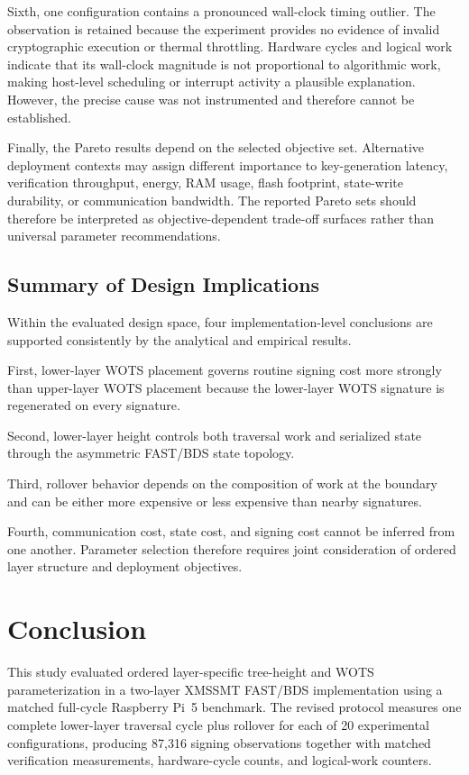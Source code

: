 \documentclass[pdflatex,sn-mathphys-num]{sn-jnl}
\begin{document}
Sixth, one configuration contains a pronounced wall-clock timing
outlier. The observation is retained because the experiment provides no
evidence of invalid cryptographic execution or thermal throttling.
Hardware cycles and logical work indicate that its wall-clock magnitude
is not proportional to algorithmic work, making host-level scheduling
or interrupt activity a plausible explanation. However, the precise
cause was not instrumented and therefore cannot be established.

Finally, the Pareto results depend on the selected objective set.
Alternative deployment contexts may assign different importance to
key-generation latency, verification throughput, energy, RAM usage,
flash footprint, state-write durability, or communication bandwidth.
The reported Pareto sets should therefore be interpreted as
objective-dependent trade-off surfaces rather than universal parameter
recommendations.

\subsection{Summary of Design Implications}
\label{sec:discussion_summary}

Within the evaluated design space, four implementation-level conclusions
are supported consistently by the analytical and empirical results.

First, lower-layer WOTS placement governs routine signing cost more
strongly than upper-layer WOTS placement because the lower-layer WOTS
signature is regenerated on every signature.

Second, lower-layer height controls both traversal work and serialized
state through the asymmetric FAST/BDS state topology.

Third, rollover behavior depends on the composition of work at the
boundary and can be either more expensive or less expensive than nearby
signatures.

Fourth, communication cost, state cost, and signing cost cannot be
inferred from one another. Parameter selection therefore requires
joint consideration of ordered layer structure and deployment
objectives.

\section{Conclusion}
\label{sec:conclusion}

This study evaluated ordered layer-specific tree-height and WOTS
parameterization in a two-layer XMSSMT FAST/BDS implementation using a
matched full-cycle Raspberry Pi~5 benchmark. The revised protocol
measures one complete lower-layer traversal cycle plus rollover for
each of 20 experimental configurations, producing 87,316 signing
observations together with matched verification measurements,
hardware-cycle counts, and logical-work counters.
\end{document}
